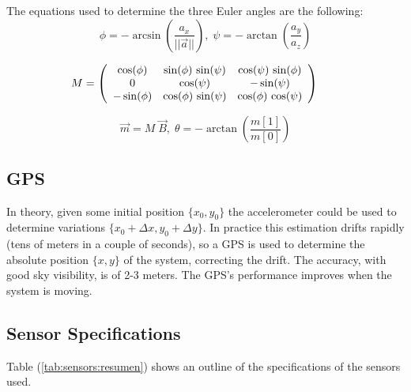 \documentclass[conference]{IEEEtran}
\newcommand{\refp}[1]{(\ref{#1})}
\begin{document}
The equations used to determine the three Euler angles are the following\cite{bib:kalman}:
  \[
  \phi = -\arcsin\left(\frac{a_x}{\vert\vert\vec{a}\vert\vert}\right), \;  
  \psi =- \arctan \left(\frac{a_y}{a_z}\right)
  \]
      
  \[
  \hspace{-20pt}
  M = 
\left(\begin{array}{ccc} \cos\!\left(\mathrm{\phi}\right) & \sin\!\left(\mathrm{\phi}\right)\, \sin\!\left(\mathrm{\psi}\right) & \cos\!\left(\mathrm{\psi}\right)\, \sin\!\left(\mathrm{\phi}\right)\\ 0 & \cos\!\left(\mathrm{\psi}\right) & - \sin\!\left(\mathrm{\psi}\right)\\ - \sin\!\left(\mathrm{\phi}\right) & \cos\!\left(\mathrm{\phi}\right)\, \sin\!\left(\mathrm{\psi}\right) & \cos\!\left(\mathrm{\phi}\right)\, \cos\!\left(\mathrm{\psi}\right) \end{array}\right)
  \]

  \[
  \vec{m} = M \; \vec{B}, \;
  \theta = -\arctan\left( \frac{m[1]}{m[0]}\right)
  \]



\subsection{GPS}
\label{sec:sensors-gps}

In theory, given some initial position $\{x_0 ,y_0\}$ the accelerometer could be used to determine variations $\{x_0+\Delta x,y_0+\Delta y\}$. In practice this estimation drifts rapidly (tens of meters in a couple of seconds), so a GPS is used to determine the absolute position $\{x,y\}$ of the system, correcting the drift. The accuracy, with good sky visibility, is of 2-3 meters. The GPS's performance improves when the system is moving.

\subsection{Sensor Specifications}
\label{sec:sensors-specifications}

Table \refp{tab:sensors:resumen} shows an outline of the specifications of the sensors used.
\end{document}

